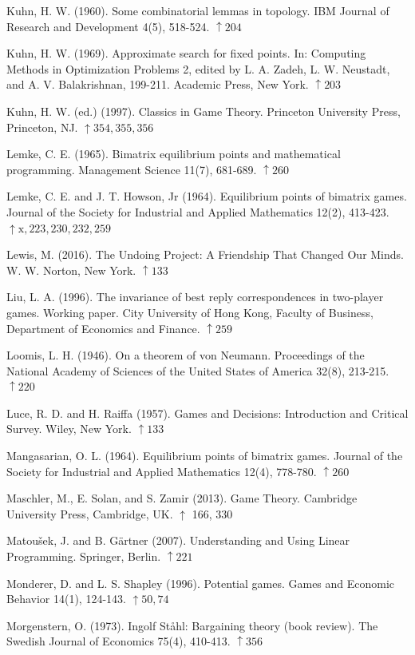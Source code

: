 \documentclass[12pt]{article}
\begin{document}
Kuhn, H. W. (1960). Some combinatorial lemmas in topology. IBM Journal of Research and Development 4(5), 518-524. $\uparrow 204$

Kuhn, H. W. (1969). Approximate search for fixed points. In: Computing Methods in Optimization Problems 2, edited by L. A. Zadeh, L. W. Neustadt, and A. V. Balakrishnan, 199-211. Academic Press, New York. $\uparrow 203$

Kuhn, H. W. (ed.) (1997). Classics in Game Theory. Princeton University Press, Princeton, NJ. $\uparrow 354,355,356$

Lemke, C. E. (1965). Bimatrix equilibrium points and mathematical programming. Management Science 11(7), 681-689. $\uparrow 260$

Lemke, C. E. and J. T. Howson, Jr (1964). Equilibrium points of bimatrix games. Journal of the Society for Industrial and Applied Mathematics 12(2), 413-423. $\uparrow \mathrm{x}, 223,230,232,259$

Lewis, M. (2016). The Undoing Project: A Friendship That Changed Our Minds. W. W. Norton, New York. $\uparrow 133$

Liu, L. A. (1996). The invariance of best reply correspondences in two-player games. Working paper. City University of Hong Kong, Faculty of Business, Department of Economics and Finance. $\uparrow 259$

Loomis, L. H. (1946). On a theorem of von Neumann. Proceedings of the National Academy of Sciences of the United States of America 32(8), 213-215. $\uparrow 220$

Luce, R. D. and H. Raiffa (1957). Games and Decisions: Introduction and Critical Survey. Wiley, New York. $\uparrow 133$

Mangasarian, O. L. (1964). Equilibrium points of bimatrix games. Journal of the Society for Industrial and Applied Mathematics 12(4), 778-780. $\uparrow 260$

Maschler, M., E. Solan, and S. Zamir (2013). Game Theory. Cambridge University Press, Cambridge, UK. $\uparrow$ 166, 330

Matoušek, J. and B. Gärtner (2007). Understanding and Using Linear Programming. Springer, Berlin. $\uparrow 221$

Monderer, D. and L. S. Shapley (1996). Potential games. Games and Economic Behavior 14(1), 124-143. $\uparrow 50,74$

Morgenstern, O. (1973). Ingolf Ståhl: Bargaining theory (book review). The Swedish Journal of Economics 75(4), 410-413. $\uparrow 356$
\end{document}
